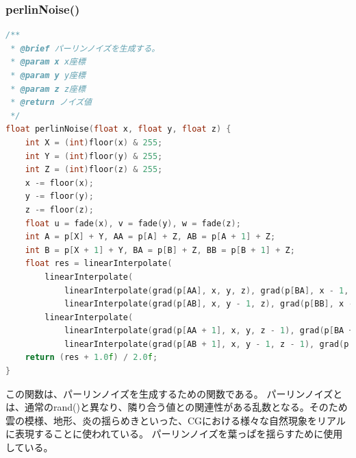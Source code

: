 \documentclass[uplatex,dvipdfmx,a4paper]{jsarticle}
\begin{document}
\hypertarget{func:perlinNoise}{}\subsubsection{perlinNoise()}\label{func:perlinNoise}
\begin{lstlisting}[language=C++, caption={perlinNoise() 関数}, label={lst:perlinNoise_detail}]
/**
 * @brief パーリンノイズを生成する。
 * @param x x座標
 * @param y y座標
 * @param z z座標
 * @return ノイズ値
 */
float perlinNoise(float x, float y, float z) {
    int X = (int)floor(x) & 255;
    int Y = (int)floor(y) & 255;
    int Z = (int)floor(z) & 255;
    x -= floor(x);
    y -= floor(y);
    z -= floor(z);
    float u = fade(x), v = fade(y), w = fade(z);
    int A = p[X] + Y, AA = p[A] + Z, AB = p[A + 1] + Z;
    int B = p[X + 1] + Y, BA = p[B] + Z, BB = p[B + 1] + Z;
    float res = linearInterpolate(
        linearInterpolate(
            linearInterpolate(grad(p[AA], x, y, z), grad(p[BA], x - 1, y, z), u),
            linearInterpolate(grad(p[AB], x, y - 1, z), grad(p[BB], x - 1, y - 1, z), u), v),
        linearInterpolate(
            linearInterpolate(grad(p[AA + 1], x, y, z - 1), grad(p[BA + 1], x - 1, y, z - 1), u),
            linearInterpolate(grad(p[AB + 1], x, y - 1, z - 1), grad(p[BB + 1], x - 1, y - 1, z - 1), u), v), w);
    return (res + 1.0f) / 2.0f;
}
\end{lstlisting}
この関数は、パーリンノイズを生成するための関数である。
パーリンノイズとは、通常のrand()と異なり、隣り合う値との関連性がある乱数となる。そのため雲の模様、地形、炎の揺らめきといった、CGにおける様々な自然現象をリアルに表現することに使われている。
パーリンノイズを葉っぱを揺らすために使用している。
\end{document}

